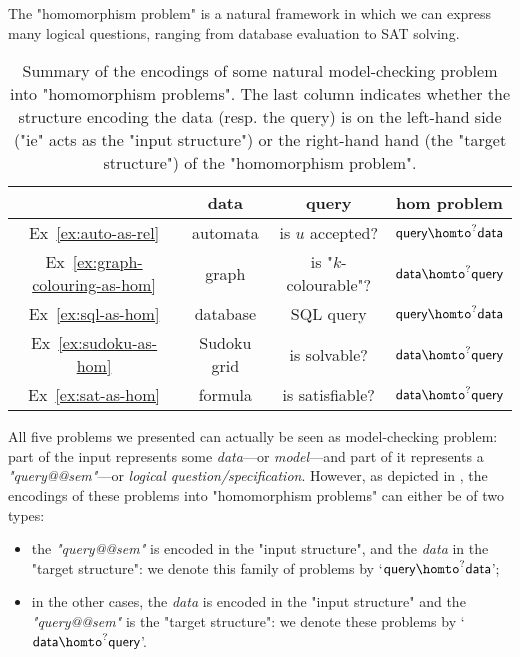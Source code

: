 \begin{known}
	The "homomorphism problem" is a natural framework in which we can express many
	logical questions, ranging from database evaluation to SAT solving.
\end{known}

\begin{table}
	\centering
	\begin{tabular}{cccc}
		\toprule 
		& data & query & hom problem \\ \midrule 
		Ex~\ref{ex:auto-as-rel} & automata & is $u$ accepted? & $\textsf{query} \homto^? \textsf{data}$ \\
		Ex~\ref{ex:graph-colouring-as-hom} & graph & is "$k$-colourable"?& $\textsf{data} \homto^? \textsf{query}$ \\
		Ex~\ref{ex:sql-as-hom} & database & SQL query & $\textsf{query} \homto^? \textsf{data}$ \\
		Ex~\ref{ex:sudoku-as-hom} & Sudoku grid & is solvable? & $\textsf{data} \homto^? \textsf{query}$ \\
		Ex~\ref{ex:sat-as-hom} & formula & is satisfiable? & $\textsf{data} \homto^? \textsf{query}$ \\ \bottomrule
	\end{tabular}
	\caption{\AP\label{tab:examples-encodings-in-hom}
		Summary of the encodings of some
		natural model-checking problem into "homomorphism problems".
		The last column indicates whether the structure encoding the data
		(resp. the query) is on the left-hand side ("ie" acts as the "input structure")
		or the right-hand hand (the "target structure")
		of the "homomorphism problem".
	}
\end{table}

All five problems we presented can actually be seen as model-checking problem:
part of the input represents some \emph{data}---or \emph{model}---and part of it represents a
\emph{"query@@sem"}---or \emph{logical question/specification}.
However, as depicted in , 
the encodings of these problems into "homomorphism problems" can either be of two types:
\begin{itemize}
	\item the \emph{"query@@sem"} is encoded in the "input structure",
		and the \emph{data} in the "target structure": we denote
		this family of problems by `$\textsf{query} \homto^? \textsf{data}$';
	\item in the other cases, the \emph{data} is encoded in the "input structure"
		and the \emph{"query@@sem"} is the "target structure": we denote
		these problems by `$\textsf{data} \homto^? \textsf{query}$'.
\end{itemize}

